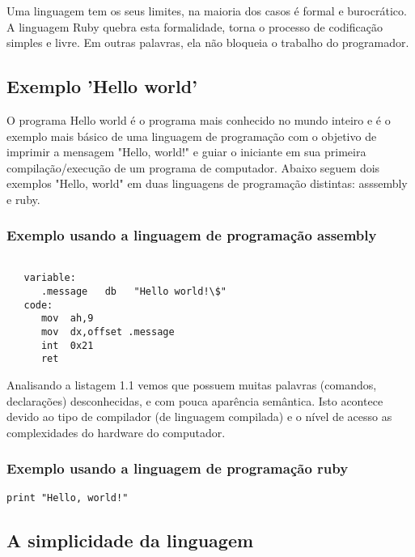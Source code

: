 \documentclass[12pt]{article}
\begin{document}
Uma linguagem tem os seus limites, na maioria dos casos é formal e burocrático. A linguagem Ruby quebra esta formalidade, torna o processo de codificação simples e livre. Em outras palavras, ela não bloqueia o trabalho do programador.

\subsection{Exemplo 'Hello world'}

   O programa Hello world é o programa mais conhecido no mundo inteiro e é o exemplo mais básico de uma linguagem de programação com o objetivo de imprimir a mensagem "Hello, world!" e guiar o iniciante em sua primeira compilação/execução de um programa de computador. Abaixo seguem dois exemplos "Hello, world" em duas linguagens de programação distintas: asssembly e ruby.


\subsubsection {Exemplo usando a linguagem de programação assembly}

\begin{lstlisting}[caption=Exemplo em assembly]

   variable:
      .message   db   "Hello world!\$"
   code:
      mov  ah,9
      mov  dx,offset .message
      int  0x21
      ret

\end{lstlisting}

Analisando a listagem 1.1 vemos que possuem muitas palavras (comandos, declarações) desconhecidas, e  com pouca aparência semântica. Isto acontece devido ao tipo de compilador (de linguagem compilada) e o nível de acesso as complexidades do hardware do computador. 

\subsubsection {Exemplo usando a linguagem de programação ruby}

\begin{lstlisting}[caption=Exemplo em ruby]
   print "Hello, world!"
\end{lstlisting}

\subsection { A simplicidade da linguagem }
\end{document}
